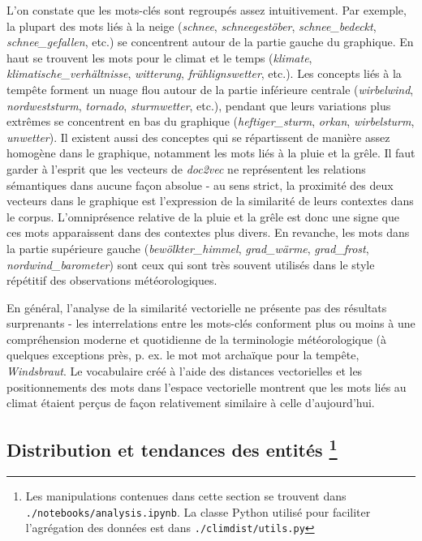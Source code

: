 \documentclass[a4paper,twoside,12pt]{article}
\begin{document}
L'on constate que les mots-clés sont regroupés assez intuitivement. Par exemple, la plupart des mots liés à la neige (\textit{schnee}, \textit{schneegestöber}, \textit{schnee\_bedeckt}, \textit{schnee\_gefallen}, etc.) se concentrent autour de la partie gauche du graphique. En haut se trouvent les mots pour le climat et le temps (\textit{klimate}, \textit{klimatische\_verhältnisse}, \textit{witterung}, \textit{frühlignswetter}, etc.). Les concepts liés à la tempête forment un nuage flou autour de la partie inférieure centrale (\textit{wirbelwind}, \textit{nordweststurm}, \textit{tornado}, \textit{sturmwetter}, etc.), pendant que leurs variations plus extrêmes se concentrent en bas du graphique (\textit{heftiger\_sturm}, \textit{orkan}, \textit{wirbelsturm}, \textit{unwetter}). Il existent aussi des conceptes qui se répartissent de manière assez homogène dans le graphique, notamment les mots liés à la pluie et la grêle. Il faut garder à l'esprit que les vecteurs de \textit{doc2vec} ne représentent les relations sémantiques dans aucune façon absolue - au sens strict, la proximité des deux vecteurs dans le graphique est l'expression de la similarité de leurs contextes dans le corpus. L'omniprésence relative de la pluie et la grêle est donc une signe que ces mots apparaissent dans des contextes plus divers. En revanche, les mots dans la partie supérieure gauche (\textit{bewölkter\_himmel}, \textit{grad\_wärme}, \textit{grad\_frost}, \textit{nordwind\_barometer}) sont ceux qui sont très souvent utilisés dans le style répétitif des observations météorologiques.


En général, l'analyse de la similarité vectorielle ne présente pas des résultats surprenants - les interrelations entre les mots-clés conforment plus ou moins à une compréhension moderne et quotidienne de la terminologie météorologique (à quelques exceptions près, p. ex. le mot mot archaïque pour la tempête, \textit{Windsbraut}. Le vocabulaire créé à l'aide des distances vectorielles et les positionnements des mots dans l'espace vectorielle montrent que les mots liés au climat étaient perçus de façon relativement similaire à celle d'aujourd'hui. 

\clearpage


\subsection{Distribution et tendances des entités \footnote{Les manipulations contenues dans cette section se trouvent dans \texttt{./notebooks/analysis.ipynb}. La classe Python utilisé pour faciliter l'agrégation des données est dans \texttt{./climdist/utils.py}}} \label{entity_distribution}
\end{document}
